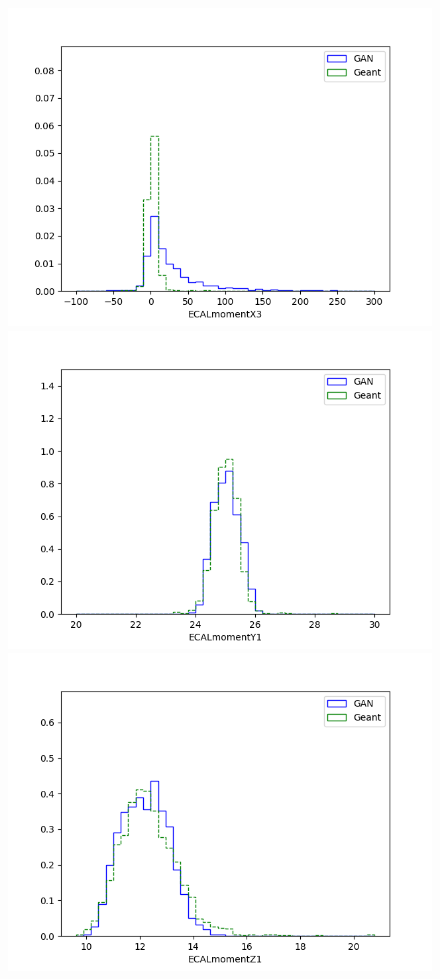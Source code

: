 \begin{figure}
    \includegraphics[scale=0.3]{Images/Calo/GAN_feature_ECALmomentX3.png}
    \includegraphics[scale=0.3]{Images/Calo/GAN_feature_ECALmomentY1.png}
    \includegraphics[scale=0.3]{Images/Calo/GAN_feature_ECALmomentZ1.png}

\end{figure}
